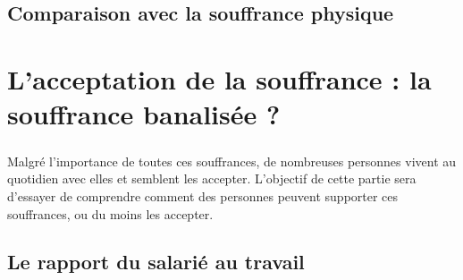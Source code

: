 \documentclass{report}
\begin{document}

	\section{Comparaison avec la souffrance physique}
		\paragraph{}

\chapter{L’acceptation de la souffrance : la souffrance banalisée ?}
	\paragraph{}
		Malgré l'importance de toutes ces souffrances, de nombreuses personnes vivent au quotidien avec elles et semblent les accepter. L'objectif de cette partie sera d'essayer de comprendre comment des personnes peuvent supporter ces souffrances, ou du moins les accepter.

	\section{Le rapport du salarié au travail}
\end{document}
